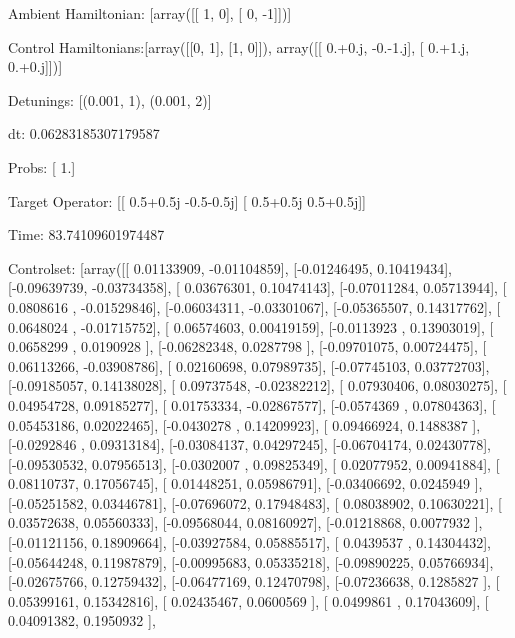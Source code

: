 \documentclass{article}
\begin{document}
    

\newpage

Ambient Hamiltonian: [array([[ 1,  0],
       [ 0, -1]])]

Control Hamiltonians:[array([[0, 1],
       [1, 0]]), array([[ 0.+0.j, -0.-1.j],
       [ 0.+1.j,  0.+0.j]])]

Detunings: [(0.001, 1), (0.001, 2)]

 dt: 0.06283185307179587

Probs: [ 1.]

Target Operator: [[ 0.5+0.5j -0.5-0.5j]
 [ 0.5+0.5j  0.5+0.5j]]

Time: 83.74109601974487

Controlset: [array([[ 0.01133909, -0.01104859],
       [-0.01246495,  0.10419434],
       [-0.09639739, -0.03734358],
       [ 0.03676301,  0.10474143],
       [-0.07011284,  0.05713944],
       [ 0.0808616 , -0.01529846],
       [-0.06034311, -0.03301067],
       [-0.05365507,  0.14317762],
       [ 0.0648024 , -0.01715752],
       [ 0.06574603,  0.00419159],
       [-0.0113923 ,  0.13903019],
       [ 0.0658299 ,  0.0190928 ],
       [-0.06282348,  0.0287798 ],
       [-0.09701075,  0.00724475],
       [ 0.06113266, -0.03908786],
       [ 0.02160698,  0.07989735],
       [-0.07745103,  0.03772703],
       [-0.09185057,  0.14138028],
       [ 0.09737548, -0.02382212],
       [ 0.07930406,  0.08030275],
       [ 0.04954728,  0.09185277],
       [ 0.01753334, -0.02867577],
       [-0.0574369 ,  0.07804363],
       [ 0.05453186,  0.02022465],
       [-0.0430278 ,  0.14209923],
       [ 0.09466924,  0.1488387 ],
       [-0.0292846 ,  0.09313184],
       [-0.03084137,  0.04297245],
       [-0.06704174,  0.02430778],
       [-0.09530532,  0.07956513],
       [-0.0302007 ,  0.09825349],
       [ 0.02077952,  0.00941884],
       [ 0.08110737,  0.17056745],
       [ 0.01448251,  0.05986791],
       [-0.03406692,  0.0245949 ],
       [-0.05251582,  0.03446781],
       [-0.07696072,  0.17948483],
       [ 0.08038902,  0.10630221],
       [ 0.03572638,  0.05560333],
       [-0.09568044,  0.08160927],
       [-0.01218868,  0.0077932 ],
       [-0.01121156,  0.18909664],
       [-0.03927584,  0.05885517],
       [ 0.0439537 ,  0.14304432],
       [-0.05644248,  0.11987879],
       [-0.00995683,  0.05335218],
       [-0.09890225,  0.05766934],
       [-0.02675766,  0.12759432],
       [-0.06477169,  0.12470798],
       [-0.07236638,  0.1285827 ],
       [ 0.05399161,  0.15342816],
       [ 0.02435467,  0.0600569 ],
       [ 0.0499861 ,  0.17043609],
       [ 0.04091382,  0.1950932 ],
\end{document}
